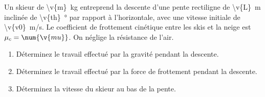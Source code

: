 Un skieur de \qty{\v{m}}{kg} entreprend la descente d'une pente rectiligne de \qty{\v{L}}{m} inclinée de \qty{\v{th}}{\degree} par rapport à l'horizontale, avec une vitesse initiale de \qty{\v{v0}}{m/s}. Le coefficient de frottement cinétique entre les skis et la neige est $\mu_c = \num{\v{mu}}$. On néglige la résistance de l'air.

\begin{enumerate}[label=\alph*)]
    \item Déterminez le travail effectué par la gravité pendant la descente.
    \item Déterminez le travail effectué par la force de frottement pendant la descente.
    \item Déterminez la vitesse du skieur au bas de la pente.
\end{enumerate}
